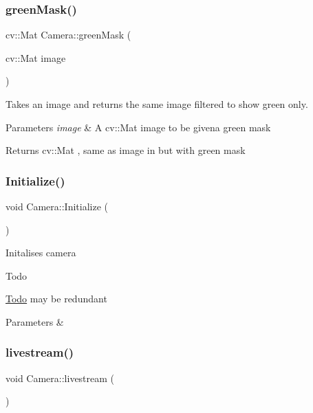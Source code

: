 \subsubsection{\texorpdfstring{green\+Mask()}{greenMask()}}
{\footnotesize\ttfamily cv\+::\+Mat Camera\+::green\+Mask (\begin{DoxyParamCaption}\item[{cv\+::\+Mat}]{image }\end{DoxyParamCaption})}



Takes an image and returns the same image filtered to show green only. 


\begin{DoxyParams}{Parameters}
{\em image} & A cv\+::\+Mat image to be givena green mask \\
\hline
\end{DoxyParams}
\begin{DoxyReturn}{Returns}
cv\+::\+Mat , same as image in but with green mask 
\end{DoxyReturn}
\mbox{\label{classCamera_afd88c2780203f02c9fe236a7239e414c}} 
\subsubsection{\texorpdfstring{Initialize()}{Initialize()}}
{\footnotesize\ttfamily void Camera\+::\+Initialize (\begin{DoxyParamCaption}{ }\end{DoxyParamCaption})}

Initalises camera \begin{DoxyRefDesc}{Todo}
\item[\hyperlink{todo__todo000002}{Todo}]may be redundant \end{DoxyRefDesc}

\begin{DoxyParams}{Parameters}
{\em } & \\
\hline
\end{DoxyParams}
\mbox{\label{classCamera_af0d3c970e947813e71f316b9e499b456}} 
\subsubsection{\texorpdfstring{livestream()}{livestream()}}
{\footnotesize\ttfamily void Camera\+::livestream (\begin{DoxyParamCaption}{ }\end{DoxyParamCaption})}

